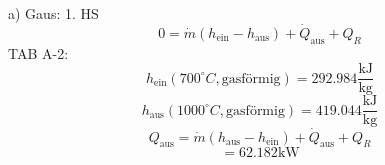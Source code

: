 a) Gaus: 1. HS
\[
0 = \dot{m}(h_{\text{ein}} - h_{\text{aus}}) + \dot{Q}_{\text{aus}} + Q_R
\]
TAB A-2:
\[
h_{\text{ein}} (700^\circ C, \text{gasförmig}) = 292.984 \frac{\text{kJ}}{\text{kg}}
\]
\[
h_{\text{aus}} (1000^\circ C, \text{gasförmig}) = 419.044 \frac{\text{kJ}}{\text{kg}}
\]
\[
Q_{\text{aus}} = \dot{m}(h_{\text{aus}} - h_{\text{ein}}) + \dot{Q}_{\text{aus}} + Q_R
\]
\[
= 62.182 \text{kW}
\]